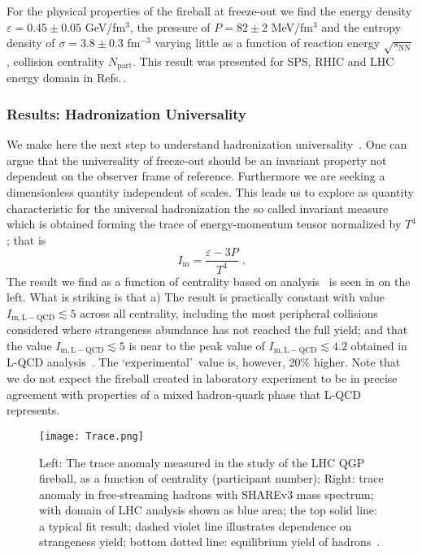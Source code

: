 \documentclass{appolb}
\begin{document}
For the physical properties of the fireball at freeze-out we find the energy density $\varepsilon=0.45\pm 0.05$ GeV/fm$^3$, the pressure of $P=82\pm 2$ MeV/fm$^3$ and the entropy density of $\sigma=3.8\pm 0.3$ fm$^{-3}$ varying little as a function of reaction energy $\sqrt{s_\mathrm{NN}}$, collision centrality $N_\mathrm{part}$. This result was presented for SPS, RHIC and LHC energy domain in Refs.\,\cite{Rafelski:2009jr,Petran:2013qla,Rafelski:2014cqa}. 



\subsubsection{Results: Hadronization Universality}

We make here the next step to understand hadronization universality~\cite{Petran:2016}. One can argue that the universality of freeze-out should be an invariant property not dependent on the observer frame of reference. Furthermore we are seeking a dimensionless quantity independent of scales. This leads us to explore as quantity characteristic for the universal hadronization the so called invariant measure which is obtained forming the trace of energy-momentum tensor normalized by $T^4$; that is 
\begin{equation}
I_\mathrm{m}=\displaystyle\frac{\varepsilon-3P}{T^4}\;.
\end{equation}
The result we find as a function of centrality based on analysis~\cite{Petran:2013lja,Petran:2013qla,Rafelski:2014cqa} is seen in  on the left. What is striking is that a) The result is practically constant with value $I_\mathrm{m, L-QCD}\lesssim 5$ across all centrality, including the most peripheral collisions considered where strangeness abundance has not reached the full yield; and that the value $I_\mathrm{m, L-QCD}\lesssim 5$ is near to the peak value of $I_\mathrm{m, L-QCD}\lesssim 4.2$ obtained in L-QCD analysis~\cite{Ding:2015ona}. The  \lq experimental\rq\ value is, however, 20\% higher.  Note that we do not expect the fireball created in laboratory experiment to be in precise agreement with properties of a mixed hadron-quark phase that L-QCD represents.

\begin{figure}[!ht]
\centering
\texttt{[image: Trace.png]}
\caption{Left: The trace anomaly measured in the study of the LHC QGP fireball, as a function of centrality (participant number); Right: trace anomaly in free-streaming hadrons with SHAREv3 mass spectrum; with domain of LHC analysis shown as blue area; the top solid line: a typical fit result; dashed violet line illustrates dependence on strangeness yield; bottom dotted line: equilibrium yield of hadrons~\cite{Petran:2016}.}
\label{TraceFig}
\end{figure}
\end{document}
